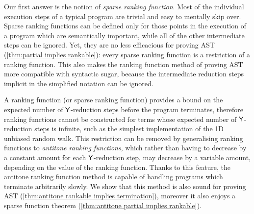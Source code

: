 Our first answer is the notion of \emph{sparse ranking function}. 
Most of the individual execution steps of a typical program are trivial and easy to mentally skip over. Sparse ranking functions can be defined only for those points in the execution of a program which are semantically important, while all of the other intermediate steps can be ignored. Yet, they are no less efficacious for proving AST (\cref{thm:partial implies rankable}): every sparse ranking function is a restriction of a ranking function. This also makes the ranking function method of proving AST more compatible with syntactic sugar, because the intermediate reduction steps implicit in the simplified notation can be ignored.

A ranking function (or sparse ranking function) provides a bound on the expected number of $\mathsf{Y}$-reduction steps before the program terminates, therefore ranking functions cannot be constructed for terms whose expected number of $\mathsf{Y}$-reduction steps is infinite, such as the simplest implementation of the 1D unbiased random walk. 
This restriction can be removed by generalising ranking functions to \emph{antitone ranking functions}, which rather than having to decrease by a constant amount for each $\mathsf{Y}$-reduction step, may decrease by a variable amount, depending on the value of the ranking function. 
Thanks to this feature, the antitone ranking function method is capable of handling programs which terminate arbitrarily slowly. 
We show that this method is also sound for proving AST (\cref{thm:antitone rankable implies termination}), 
moreover it also enjoys a sparse function theorem (\cref{thm:antitone partial implies rankable}).

